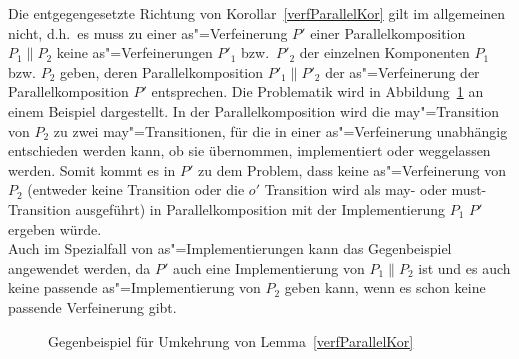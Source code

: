 Die entgegengesetzte Richtung von Korollar~\ref{verfParallelKor} gilt im
allgemeinen nicht, d.h.\ es muss zu einer as"=Verfeinerung $P'$ einer
Parallelkomposition $P_1\|P_2$ keine as"=Verfeinerungen $P'_1$ bzw.\
$P'_2$ der einzelnen Komponenten $P_1$ bzw. $P_2$ geben, deren
Parallelkomposition $P'_1\|P'_2$ der as"=Verfeinerung der Parallelkomposition
$P'$ entsprechen. Die Problematik wird in Abbildung~\ref{impParallelFig} an
einem Beispiel dargestellt. In der Parallelkomposition wird die may"=Transition
von $P_2$ zu zwei may"=Transitionen, für die in einer as"=Verfeinerung
unabhängig entschieden werden kann, ob sie übernommen, implementiert oder
weggelassen werden. Somit kommt es in $P'$ zu dem Problem, dass keine
as"=Verfeinerung von $P_2$ (entweder keine Transition oder die $o'$ Transition
wird als may- oder must-Transition ausgeführt) in Parallelkomposition mit der
Implementierung $P_1$ $P'$ ergeben würde.\\
Auch im Spezialfall von as"=Implementierungen kann das Gegenbeispiel angewendet
werden, da $P'$ auch eine Implementierung von $P_1\|P_2$ ist und es auch keine
passende as"=Implementierung von $P_2$ geben kann, wenn es schon keine passende
Verfeinerung gibt.

\begin{figure}[htbp]
  \begin{center}
    \caption{Gegenbeispiel für Umkehrung von Lemma~\ref{verfParallelKor}}
    \label{impParallelFig}
  \end{center}
\end{figure}


